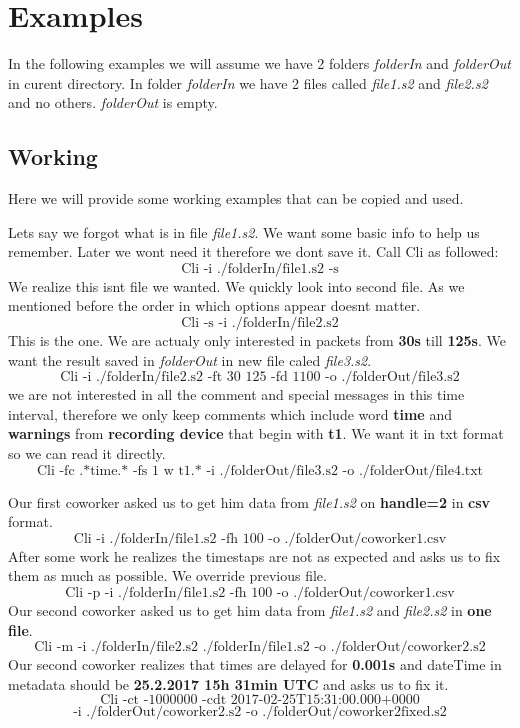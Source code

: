 \documentclass[english]{article}
\begin{document}
\section{Examples}

In the following examples we will assume we have 2 folders \textit{folderIn} and \textit{folderOut} in curent directory. In folder \textit{folderIn} we have 2 files called \textit{file1.s2} and \textit{file2.s2} and no others. \textit{folderOut} is empty.

\subsection{Working}
Here we will provide some working examples that can be copied and used. 

Lets say we forgot what is in file \textit{file1.s2}. We want some basic info to help us remember. Later we wont need it therefore we dont save it. Call Cli as followed:
$$\text{Cli -i ./folderIn/file1.s2 -s}$$
We realize this isnt file we wanted. We quickly look into second file. As we mentioned before the order in which options appear doesnt matter.
$$\text{Cli -s -i ./folderIn/file2.s2}$$
This is the one. We are actualy only interested in packets from \textbf{30s} till \textbf{125s}. We want the result saved in \textit{folderOut} in new file caled \textit{file3.s2}.
$$\text{Cli -i ./folderIn/file2.s2 -ft 30 125 -fd 1100 -o ./folderOut/file3.s2}$$
we are not interested in all the comment and special messages in this time interval, therefore we only keep comments which include word \textbf{time} and \textbf{warnings} from \textbf{recording device} that begin with \textbf{t1}. We want it in txt format so we can read it directly.
$$\text{Cli -fc .*time.* -fs 1 w t1.* -i ./folderOut/file3.s2 -o ./folderOut/file4.txt}$$


Our first coworker asked us to get him data from \textit{file1.s2} on \textbf{handle=2} in \textbf{csv} format.
$$\text{Cli -i ./folderIn/file1.s2  -fh 100 -o ./folderOut/coworker1.csv}$$
After some work he realizes the timestaps are not as expected and asks us to fix them as much as possible. We override previous file.
$$\text{Cli -p -i ./folderIn/file1.s2 -fh 100 -o ./folderOut/coworker1.csv}$$
Our second coworker asked us to get him data from \textit{file1.s2} and \textit{file2.s2} in \textbf{one file}.
$$\text{Cli -m -i ./folderIn/file2.s2 ./folderIn/file1.s2 -o ./folderOut/coworker2.s2}$$
Our second coworker realizes that times are delayed for \textbf{0.001s} and dateTime in metadata should be \textbf{25.2.2017 15h 31min UTC} and asks us to fix it.
$$\text{Cli -ct -1000000 -cdt 2017-02-25T15:31:00.000+0000}$$ $$ \text{-i ./folderOut/coworker2.s2 -o ./folderOut/coworker2fixed.s2}$$
\end{document}
